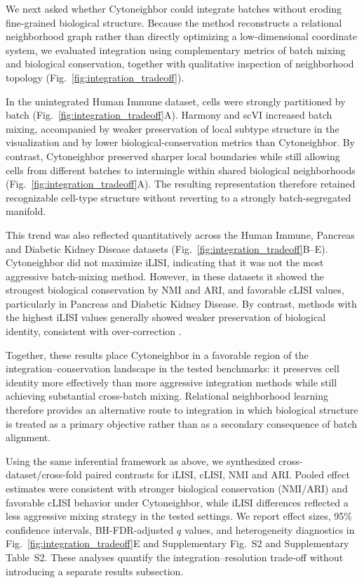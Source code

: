 \documentclass[11pt]{article}
\begin{document}
We next asked whether Cytoneighbor could integrate batches without eroding fine-grained biological structure. Because the method reconstructs a relational neighborhood graph rather than directly optimizing a low-dimensional coordinate system, we evaluated integration using complementary metrics of batch mixing and biological conservation, together with qualitative inspection of neighborhood topology (Fig.~\ref{fig:integration_tradeoff}).

In the unintegrated Human Immune dataset, cells were strongly partitioned by batch (Fig.~\ref{fig:integration_tradeoff}A). Harmony and scVI increased batch mixing, accompanied by weaker preservation of local subtype structure in the visualization and by lower biological-conservation metrics than Cytoneighbor. By contrast, Cytoneighbor preserved sharper local boundaries while still allowing cells from different batches to intermingle within shared biological neighborhoods (Fig.~\ref{fig:integration_tradeoff}A). The resulting representation therefore retained recognizable cell-type structure without reverting to a strongly batch-segregated manifold.

This trend was also reflected quantitatively across the Human Immune, Pancreas and Diabetic Kidney Disease datasets (Fig.~\ref{fig:integration_tradeoff}B--E). Cytoneighbor did not maximize iLISI, indicating that it was not the most aggressive batch-mixing method. However, in these datasets it showed the strongest biological conservation by NMI and ARI, and favorable cLISI values, particularly in Pancreas and Diabetic Kidney Disease. By contrast, methods with the highest iLISI values generally showed weaker preservation of biological identity, consistent with over-correction \cite{Korsunsky2019Harmony,HubertArabie1985ARI,Vinh2010NMI,Sokolova2009PerformanceMeasures}.

Together, these results place Cytoneighbor in a favorable region of the integration--conservation landscape in the tested benchmarks: it preserves cell identity more effectively than more aggressive integration methods while still achieving substantial cross-batch mixing. Relational neighborhood learning therefore provides an alternative route to integration in which biological structure is treated as a primary objective rather than as a secondary consequence of batch alignment.

Using the same inferential framework as above, we synthesized cross-dataset/cross-fold paired contrasts for iLISI, cLISI, NMI and ARI. Pooled effect estimates were consistent with stronger biological conservation (NMI/ARI) and favorable cLISI behavior under Cytoneighbor, while iLISI differences reflected a less aggressive mixing strategy in the tested settings. We report effect sizes, 95\% confidence intervals, BH-FDR-adjusted $q$ values, and heterogeneity diagnostics in Fig.~\ref{fig:integration_tradeoff}E and Supplementary Fig.~S2 and Supplementary Table~S2. These analyses quantify the integration--resolution trade-off without introducing a separate results subsection.
\end{document}
